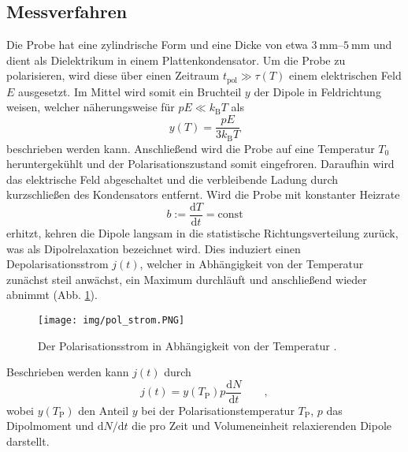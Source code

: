 \subsection{Messverfahren} %
\label{sub:messverfahren}

Die Probe hat eine zylindrische Form und eine Dicke von etwa $\SIrange{3}{5}{\milli\meter}$ und dient als Dielektrikum in einem Plattenkondensator.
Um die Probe zu polarisieren, wird diese über einen Zeitraum $t_{\text{pol}} \gg \tau(T)$ einem elektrischen Feld $E$ ausgesetzt.
Im Mittel wird somit ein Bruchteil $y$ der Dipole in Feldrichtung weisen, welcher näherungsweise für $pE \ll k_\text{B} T$ als
\begin{equation}
    y(T) = \frac{p E}{3 k_\text{B} T} \label{y_t}
\end{equation}
beschrieben werden kann.
Anschließend wird die Probe auf eine Temperatur $T_0$ heruntergekühlt und der Polarisationszustand somit eingefroren.
Daraufhin wird das elektrische Feld abgeschaltet und die verbleibende Ladung durch kurzschließen des Kondensators entfernt.
Wird die Probe mit konstanter Heizrate
\begin{equation}
    b := \frac{\mathrm{d}T}{\mathrm{d}t} = \text{const}
\end{equation}
erhitzt, kehren die Dipole langsam in die statistische Richtungsverteilung zurück, was als Dipolrelaxation bezeichnet wird.
Dies induziert einen Depolarisationsstrom $j(t)$, welcher in Abhängigkeit von der Temperatur zunächst steil anwächst, ein Maximum durchläuft und anschließend wieder abnimmt (Abb. \ref{fig:pol_strom}).
\begin{figure}
    \centering
    \texttt{[image: img/pol\_strom.PNG]}
    \caption{Der Polarisationsstrom in Abhängigkeit von der Temperatur \cite{V48}.}
    \label{fig:pol_strom}
\end{figure}
Beschrieben werden kann $j(t)$ durch
\begin{equation}
    j(t) = y(T_\mathrm{P}) p \frac{\mathrm{d}N}{\mathrm{d}t} \qquad,
\end{equation}
wobei $y(T_\mathrm{P})$ den Anteil $y$ bei der Polarisationstemperatur $T_\mathrm{P}$, $p$ das Dipolmoment und $\mathrm{d}N/\mathrm{d}t$ die pro Zeit und Volumeneinheit relaxierenden Dipole darstellt.


